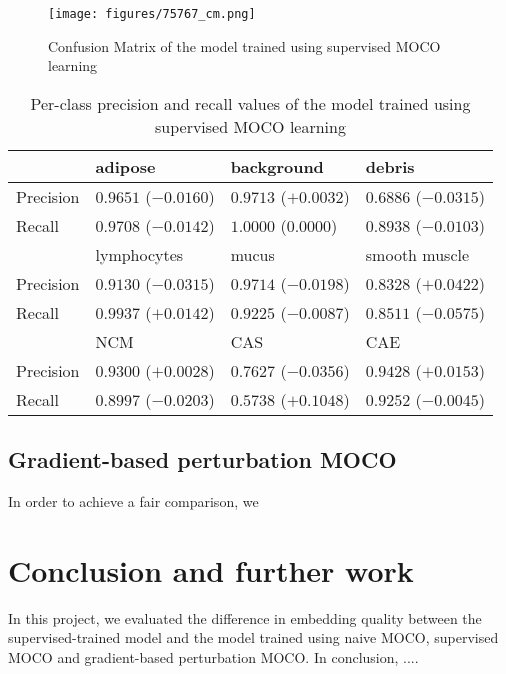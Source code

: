 \documentclass[12pt,twoside]{report}
\begin{document}
\begin{figure}
    \centering
    \texttt{[image: figures/75767\_cm.png]}
    \caption{Confusion Matrix of the model trained using supervised MOCO learning}
    \label{fig:supervisedMOCO_cm}
\end{figure}

\begin{table}[]
    \centering
    \begin{tabular}{llll}
\toprule
 & adipose & background & debris \\
\hline
Precision & $0.9651$ ($-0.0160$) & $0.9713$ ($+0.0032$) & $0.6886$ ($-0.0315$) \\
Recall & $0.9708$ ($-0.0142$) & $1.0000$ ($0.0000$) & $0.8938$ ($-0.0103$) \\
\toprule
 & lymphocytes & mucus & smooth muscle \\
\hline
Precision & $0.9130$ ($-0.0315$) & $0.9714$ ($-0.0198$) & $0.8328$ ($+0.0422$) \\
Recall & $0.9937$ ($+0.0142$) & $0.9225$ ($-0.0087$) & $0.8511$ ($-0.0575$) \\
\toprule
 & NCM & CAS & CAE \\
\hline
Precision & $0.9300$ ($+0.0028$) & $0.7627$ ($-0.0356$) & $0.9428$ ($+0.0153$) \\
Recall & $0.8997$ ($-0.0203$) & $0.5738$ ($+0.1048$) & $0.9252$ ($-0.0045$) \\
    \bottomrule
    \end{tabular}
    \caption{Per-class precision and recall values of the model trained using supervised MOCO learning}
    \label{tab:supervisedMOCO_preci_recall}
\end{table}


\section{Gradient-based perturbation MOCO} \label{sec:gradientMOCO_eval}
In order to achieve a fair comparison, we 

\chapter{Conclusion and further work}

In this project, we evaluated the difference in embedding quality between the supervised-trained model and the model trained using naive MOCO, supervised MOCO and gradient-based perturbation MOCO. In conclusion, .... \\
\end{document}
